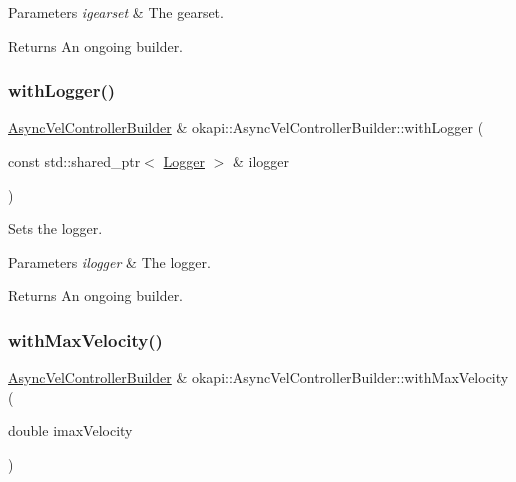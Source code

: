 \begin{DoxyParams}{Parameters}
{\em igearset} & The gearset. \\
\hline
\end{DoxyParams}
\begin{DoxyReturn}{Returns}
An ongoing builder. 
\end{DoxyReturn}
\mbox{\label{classokapi_1_1AsyncVelControllerBuilder_a39fc6798e638b770cd10674bfebbb844}} 
\subsubsection{\texorpdfstring{withLogger()}{withLogger()}}
{\footnotesize\ttfamily \mbox{\hyperlink{classokapi_1_1AsyncVelControllerBuilder}{Async\+Vel\+Controller\+Builder}} \& okapi\+::\+Async\+Vel\+Controller\+Builder\+::with\+Logger (\begin{DoxyParamCaption}\item[{const std\+::shared\+\_\+ptr$<$ \mbox{\hyperlink{classokapi_1_1Logger}{Logger}} $>$ \&}]{ilogger }\end{DoxyParamCaption})}

Sets the logger.


\begin{DoxyParams}{Parameters}
{\em ilogger} & The logger. \\
\hline
\end{DoxyParams}
\begin{DoxyReturn}{Returns}
An ongoing builder. 
\end{DoxyReturn}
\mbox{\label{classokapi_1_1AsyncVelControllerBuilder_a7e4651e36c2a2dffa425a95c70bdd703}} 
\subsubsection{\texorpdfstring{withMaxVelocity()}{withMaxVelocity()}}
{\footnotesize\ttfamily \mbox{\hyperlink{classokapi_1_1AsyncVelControllerBuilder}{Async\+Vel\+Controller\+Builder}} \& okapi\+::\+Async\+Vel\+Controller\+Builder\+::with\+Max\+Velocity (\begin{DoxyParamCaption}\item[{double}]{imax\+Velocity }\end{DoxyParamCaption})}

